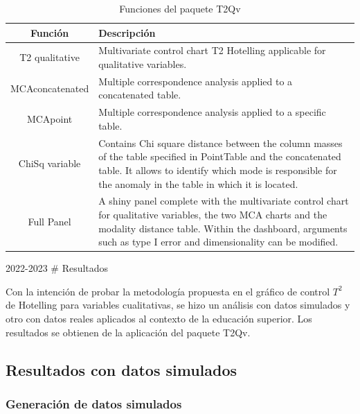 \documentclass[mathematics,article,submit,moreauthors,pdftex]{mdpi}
\begin{document}
\begin{table}[h!]
\begin{center}
 \begin{tabular}{||c  m{35em}||} 
 \hline
  Función & Descripción \\ [0.5ex] 
 \hline\hline
 T2 qualitative & Multivariate control chart T2 Hotelling applicable for qualitative variables.\\
 \hline
  MCAconcatenated & Multiple correspondence analysis applied to a concatenated table.\\
\hline
  MCApoint & Multiple correspondence analysis applied to a specific table.\\
\hline
  ChiSq variable & Contains Chi square distance between the column masses of the table specified in PointTable and the concatenated table. It allows to identify which mode is responsible for the anomaly in the table in which it is located. \\ [1ex] 
  \hline
  Full Panel & A shiny panel complete with the 
  multivariate control chart for 
  qualitative variables, the two MCA 
  charts and the modality distance table. 
  Within the dashboard, arguments such as 
  type I error and dimensionality can be 
  modified. \\ [1ex] 
 \hline
\end{tabular}\caption{Funciones del paquete T2Qv}
\label{tab:functions}
\end{center}
\end{table}

2022-2023 \# Resultados

Con la intención de probar la metodología propuesta en el gráfico de
control \(T^2\) de Hotelling para variables cualitativas, se hizo un
análisis con datos simulados y otro con datos reales aplicados al
contexto de la educación superior. Los resultados se obtienen de la
aplicación del paquete T2Qv.

\hypertarget{resultados-con-datos-simulados}{%
\subsection{Resultados con datos
simulados}\label{resultados-con-datos-simulados}}

\hypertarget{generaciuxf3n-de-datos-simulados}{%
\subsubsection{Generación de datos
simulados}\label{generaciuxf3n-de-datos-simulados}}
\end{document}

